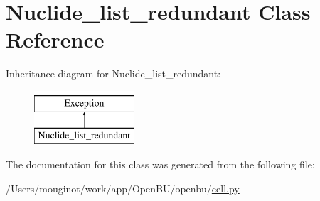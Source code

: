 \hypertarget{classopenbu_1_1cell_1_1_nuclide__list__redundant}{}\section{Nuclide\+\_\+list\+\_\+redundant Class Reference}
\label{classopenbu_1_1cell_1_1_nuclide__list__redundant}
Inheritance diagram for Nuclide\+\_\+list\+\_\+redundant\+:\begin{figure}[H]
\begin{center}
\leavevmode
\includegraphics[height=2.000000cm]{classopenbu_1_1cell_1_1_nuclide__list__redundant}
\end{center}
\end{figure}


The documentation for this class was generated from the following file\+:\begin{DoxyCompactItemize}
\item 
/\+Users/mouginot/work/app/\+Open\+B\+U/openbu/\mbox{\hyperlink{cell_8py}{cell.\+py}}\end{DoxyCompactItemize}
